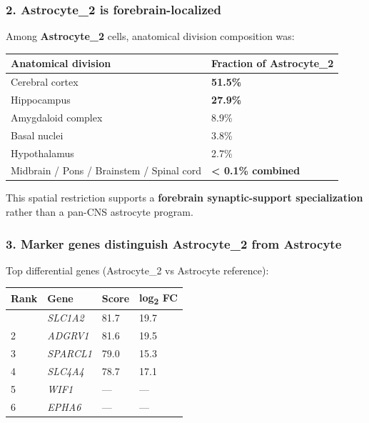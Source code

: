 \documentclass[
  11pt,
]{article}
\newcounter{none} %
\begin{document}
\subsubsection{2. Astrocyte\_2 is
forebrain-localized}\label{astrocyte_2-is-forebrain-localized}

Among \textbf{Astrocyte\_2} cells, anatomical division composition was:

{\def\LTcaptype{none} %
\begin{longtable}[]{@{}ll@{}}
\toprule\noalign{}
Anatomical division & Fraction of Astrocyte\_2 \\
\midrule\noalign{}
\endhead
\bottomrule\noalign{}
\endlastfoot
Cerebral cortex & \textbf{51.5\%} \\
Hippocampus & \textbf{27.9\%} \\
Amygdaloid complex & 8.9\% \\
Basal nuclei & 3.8\% \\
Hypothalamus & 2.7\% \\
Midbrain / Pons / Brainstem / Spinal cord & \textbf{\textless{} 0.1\%
combined} \\
\end{longtable}
}

This spatial restriction supports a \textbf{forebrain synaptic-support
specialization} rather than a pan-CNS astrocyte program.

\subsubsection{3. Marker genes distinguish Astrocyte\_2 from
Astrocyte}\label{marker-genes-distinguish-astrocyte_2-from-astrocyte}

Top differential genes (Astrocyte\_2 vs Astrocyte reference):

{\def\LTcaptype{none} %
\begin{longtable}[]{@{}llll@{}}
\toprule\noalign{}
Rank & Gene & Score & log\textsubscript{2} FC \\
\midrule\noalign{}
\endhead
\bottomrule\noalign{}
\endlastfoot
1 & \emph{SLC1A2} & 81.7 & 19.7 \\
2 & \emph{ADGRV1} & 81.6 & 19.5 \\
3 & \emph{SPARCL1} & 79.0 & 15.3 \\
4 & \emph{SLC4A4} & 78.7 & 17.1 \\
5 & \emph{WIF1} & --- & --- \\
6 & \emph{EPHA6} & --- & --- \\
\end{longtable}
}
\end{document}
